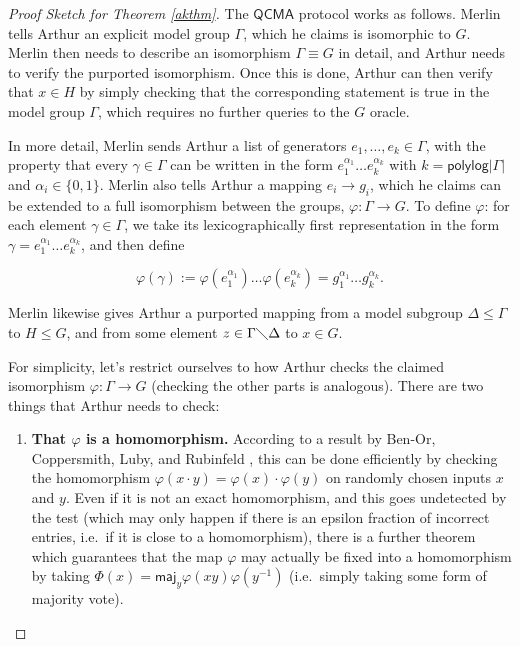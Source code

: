 \documentclass[12pt]{report}
\theoremstyle{plain}
\theoremstyle{definition}
\begin{document}
\begin{proof}[Proof Sketch for Theorem \ref{akthm}]
  The $\mathsf{QCMA}$ protocol works as follows.  Merlin tells Arthur an explicit model group $\Gamma$, which he claims is isomorphic to $G$.  Merlin then needs to describe an isomorphism $\Gamma \equiv G$ in detail, and Arthur needs to verify the purported isomorphism.  Once this is done, Arthur can then verify that $x\in H$ by simply checking that the corresponding statement is true in the model group $\Gamma$, which requires no further queries to the $G$ oracle.

  In more detail, Merlin sends Arthur a list of generators $e_1,
  \ldots, e_k \in \Gamma$, with the property that every $\gamma \in \Gamma$ can be written in the form $e_1^{\alpha_1} \ldots e_k^{\alpha_k}$ with $k = \mathsf{polylog} | \Gamma |$ and $\alpha_i \in \{0,1\}$.  Merlin also tells Arthur a mapping $e_i \rightarrow g_i$,
  which he claims can be extended to a full isomorphism between the groups, $\varphi : \Gamma
  \rightarrow G$.  To define $\varphi$: for each element $\gamma \in
  \Gamma$, we take its lexicographically first representation in the form $\gamma = e_1^{\alpha_1} \ldots
  e_k^{\alpha_k}$, and then define

  $$ \varphi ( \gamma) := \varphi (  e_1^{\alpha_1}) \ldots \varphi ( e_k^{\alpha_k}) = g_1^{\alpha_1} \ldots  g_k^{\alpha_k}. $$

  Merlin likewise gives Arthur a purported mapping from a model subgroup $\Delta \leq \Gamma$ to $H\leq G$, and from some element $z\in \Gamma \diagdown \Delta$ to $x\in G$.

  For simplicity, let's restrict ourselves to how Arthur checks the claimed isomorphism $\varphi : \Gamma
  \rightarrow G$ (checking the other parts is analogous).  There are two things that Arthur needs to check:
  \begin{enumerate}
    \item \textbf{That $\varphi$ is a homomorphism.}
    According to a result by Ben-Or, Coppersmith, Luby, and Rubinfeld \cite{bclr}, this can be done efficiently by checking the homomorphism $\varphi ( x \cdot y) =  \varphi ( x) \cdot \varphi ( y)$ on randomly chosen inputs $x$ and $y$.
    Even if it is not an exact homomorphism, and this goes undetected by the test (which may only happen if there is an epsilon fraction of incorrect entries, i.e.\ if it is close to a homomorphism), there is a further theorem which guarantees that the map $\varphi$ may actually be fixed into a homomorphism by taking $\Phi ( x) = \mathsf{maj}_y   \varphi ( x y) \varphi ( y^{- 1})$ (i.e.\ simply taking some form of majority vote).


\end{enumerate}
\end{proof}
\end{document}
